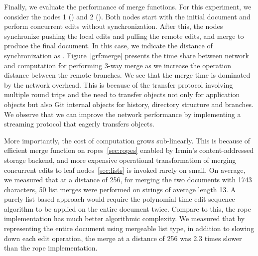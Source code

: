 Finally, we evaluate the performance of merge functions. For this experiment,
we consider the nodes 1 () and 2 (). Both
nodes start with the initial document and perform  concurrent edits
without synchronization. After this, the nodes synchronize pushing the local
edits and pulling the remote edits, and merge to produce the final document. In
this case, we indicate the distance of synchronization as .
Figure~\ref{grf:merge} presents the time share between network and computation
for performing 3-way merge as we increase the operation distance between the
remote branches. We see that the merge time is dominated by the network
overhead. This is because of the transfer protocol involving multiple
round trips and the need to transfer objects not only for application objects
but also Git internal objects for history, directory structure and branches. We
observe that we can improve the network performance by implementing a streaming
protocol that eagerly transfers objects.

More importantly, the cost of computation grows sub-linearly. This is because
of efficient merge function on ropes~\ref{sec:ropes} enabled by Irmin's
content-addressed storage backend, and more expensive operational
transformation of merging concurrent edits to leaf nodes~\ref{sec:lists} is invoked
rarely on small. On average, we measured that at a distance of 256, for merging
the two documents with 1743 characters, 50 list merges were performed on
strings of average length 13. A purely list based approach would require the
polynomial time edit sequence algorithm to be applied on the entire document
twice. Compare to this, the rope implementation has much better algorithmic
complexity. We measured that by representing the entire document using
mergeable list type, in addition to slowing down each edit operation, the merge
at a distance of 256 was 2.3 times slower than the rope implementation.
